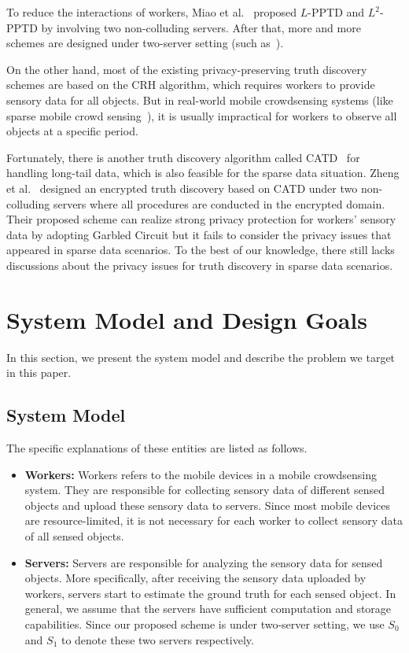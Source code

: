 \documentclass[conference]{IEEEtran}
\begin{document}
To reduce the interactions of workers, Miao et al.~\cite{miao_lightweight_2017} proposed $L$-PPTD and $L^2$-PPTD by involving two non-colluding servers.
After that, more and more schemes are designed under two-server setting (such as~\cite{zhang_lptd_2019,zhang_reliable_2019,xue_inpptd_2020,tang_achieving_2021}).

On the other hand, most of the existing privacy-preserving truth discovery schemes are based on the CRH algorithm, which requires workers to provide sensory data for all objects.
But in real-world mobile crowdsensing systems (like sparse mobile crowd sensing~\cite{wang_sparse_2016}), it is usually impractical for workers to observe all objects at a specific period.

Fortunately, there is another truth discovery algorithm called CATD~\cite{li_confidence-aware_2014} for handling long-tail data, which is also feasible for the sparse data situation.
Zheng et al.~\cite{zheng_learning_2018} designed an encrypted truth discovery based on CATD under two non-colluding servers where all procedures are conducted in the encrypted domain.
Their proposed scheme can realize strong privacy protection for workers' sensory data by adopting Garbled Circuit but it fails to consider the privacy issues that appeared in sparse data scenarios.
To the best of our knowledge, there still lacks discussions about the privacy issues for truth discovery in sparse data scenarios.

\section{System Model and Design Goals}\label{sec3}
In this section, we present the system model and describe the problem we target in this paper.
\subsection{System Model}\label{sec3-A}
The specific explanations of these entities are listed as follows.

\begin{itemize}
  \item \textbf{Workers:} Workers refers to the mobile devices in a mobile crowdsensing system. They are responsible for collecting sensory data of different sensed objects and upload these sensory data to servers. Since most mobile devices are resource-limited, it is not necessary for each worker to collect sensory data of all sensed objects.
  \item \textbf{Servers:} Servers are responsible for analyzing the sensory data for sensed objects. More specifically, after receiving the sensory data uploaded by workers, servers start to estimate the ground truth for each sensed object. In general, we assume that the servers have sufficient computation and storage capabilities. Since our proposed scheme is under two-server setting, we use $S_0$ and $S_1$ to denote these two servers respectively.
\end{itemize}
\end{document}
